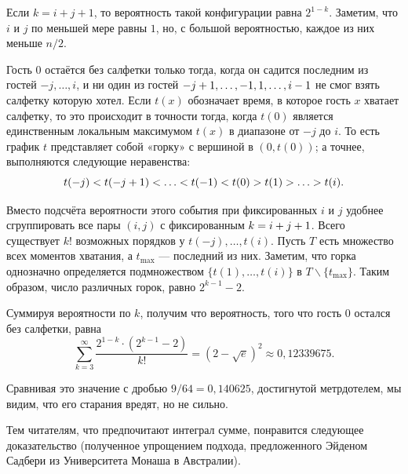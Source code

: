 Если $k = i+j+1$, то вероятность такой конфигурации равна $2^{1-k}$.
Заметим, что $i$ и $j$ по меньшей мере равны $1$, но, с большой вероятностью, каждое из них меньше $n/2$.

Гость $0$ остаётся без салфетки только тогда, когда он садится последним из гостей $-j,\dots,i$, и ни один из гостей $-j\z+1,\z\dots,-1,1,\dots,i-1$ не смог взять салфетку которую хотел.
Если $t(x)$ обозначает время, в которое гость $x$ хватает салфетку, то это происходит в точности тогда, когда $t(0)$ является единственным локальным максимумом $t(x)$ в диапазоне от $-j$ до $i$.
То есть график $t$ представляет собой «горку» с вершиной в $(0,t(0))$; 
а точнее, выполняются следующие неравенства: 
\[t(-j)\z<t(-j+1) \z<\z\dots\z<t(-1)\z<t(0)\z>t(1)\z>\z\dots\z>t(i).\]

Вместо подсчёта вероятности этого события при фиксированных $i$ и $j$ удобнее сгруппировать все пары $(i, j)$ с фиксированным $k=i\z+j+1$.
Всего существует $k!$ возможных порядков у $t(- j),\dots, t (i)$.
Пусть $T$ есть множество всех моментов хватания, а $t_{{\max}}$ --- последний из них. 
Заметим, что горка однозначно определяется подмножеством $\{t(1),\dots,t(i)\}$ в $T\backslash \{t_{{\max}}\}$.
Таким образом, число различных горок, равно $2^{k-1}-2$.

Суммируя вероятности по $k$, получим что вероятность, того что гость 0 остался без салфетки, равна
\[\sum_{k=3}^\infty\frac{2^{1-k}\cdot(2^{k-1}-2)}{k!}=(2-\sqrt{e})^2\approx 0{,}12339675.\]
\heart

Сравнивая это значение с дробью $9/64 = 0{,}140625$, достигнутой метрдотелем, мы видим, что его старания вредят, но не сильно.

\medskip

Тем читателям, что предпочитают интеграл сумме, понравится следующее доказательство (полученное упрощением подхода, предложенного Эйденом Садбери из Университета Монаша в Австралии).

\medskip

